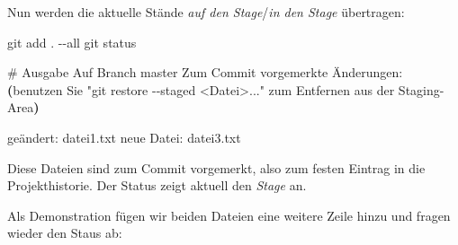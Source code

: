\documentclass[
  letterpaper,
  DIV=11]{scrreprt}
\newenvironment{Shaded}{\begin{snugshade}}{\end{snugshade}}
\newcommand{\AttributeTok}[1]{\textcolor[rgb]{0.40,0.45,0.13}{#1}}
\newcommand{\CommentTok}[1]{\textcolor[rgb]{0.37,0.37,0.37}{#1}}
\newcommand{\ExtensionTok}[1]{\textcolor[rgb]{0.00,0.23,0.31}{#1}}
\newcommand{\FunctionTok}[1]{\textcolor[rgb]{0.28,0.35,0.67}{#1}}
\newcommand{\KeywordTok}[1]{\textcolor[rgb]{0.00,0.23,0.31}{\textbf{#1}}}
\newcommand{\NormalTok}[1]{\textcolor[rgb]{0.00,0.23,0.31}{#1}}
\newcommand{\StringTok}[1]{\textcolor[rgb]{0.13,0.47,0.30}{#1}}
\begin{document}
Nun werden die aktuelle Stände \emph{auf den Stage}/\emph{in den Stage}
übertragen:

\begin{Shaded}
\begin{Highlighting}[]
\FunctionTok{git}\NormalTok{ add . }\AttributeTok{{-}{-}all} 
\FunctionTok{git}\NormalTok{ status }

\CommentTok{\# Ausgabe  }
\ExtensionTok{Auf}\NormalTok{ Branch master}
\ExtensionTok{Zum}\NormalTok{ Commit vorgemerkte Änderungen:}
  \KeywordTok{(}\ExtensionTok{benutzen}\NormalTok{ Sie }\StringTok{"git restore {-}{-}staged \textless{}Datei\textgreater{}..."}  
   \ExtensionTok{zum}\NormalTok{ Entfernen aus der Staging{-}Area}\KeywordTok{)}  

    \ExtensionTok{geändert:}\NormalTok{       datei1.txt}
    \ExtensionTok{neue}\NormalTok{ Datei:     datei3.txt}
\end{Highlighting}
\end{Shaded}

Diese Dateien sind zum Commit vorgemerkt, also zum festen Eintrag in die
Projekthistorie. Der Status zeigt aktuell den \emph{Stage} an.

Als Demonstration fügen wir beiden Dateien eine weitere Zeile hinzu und
fragen wieder den Staus ab:
\end{document}
